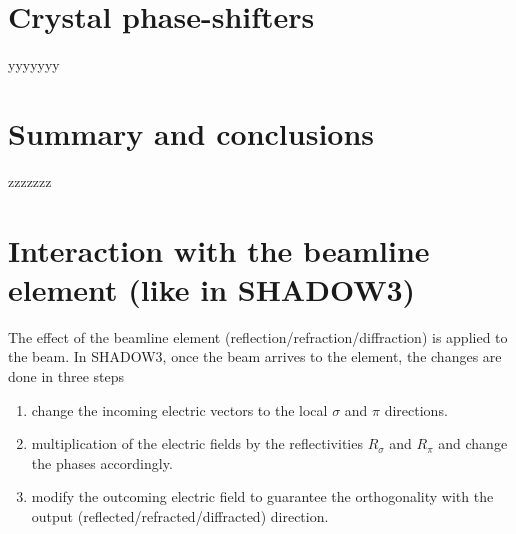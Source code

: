 \documentclass{iucr}
\begin{document}
\section{Crystal phase-shifters}\label{sec:phasesifters}

yyyyyyy


\section{Summary and conclusions}
\label{sec:summary}

zzzzzzz



\appendix

\section{Interaction with the beamline element (like in SHADOW3)}
\label{sec:S3}

The effect of the beamline element (reflection/refraction/diffraction) is applied to the beam. In SHADOW3, once the beam arrives to the element, the changes are done in three steps 
\begin{enumerate}
    \item change the incoming electric vectors to the local $\sigma$ and $\pi$ directions.
    \item multiplication of the electric fields by the reflectivities $R_\sigma$ and $R_\pi$ and change the phases accordingly.
    \item modify the outcoming electric field to guarantee the orthogonality with the output (reflected/refracted/diffracted) direction.
\end{enumerate}
\end{document}
